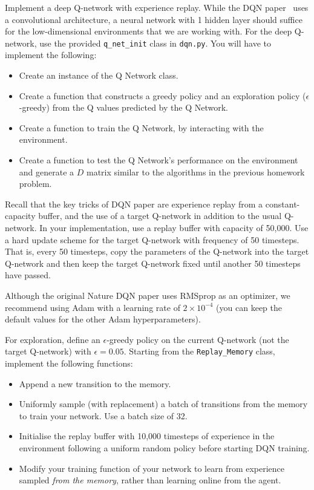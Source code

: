 \documentclass[12pt]{article}
\begin{document}
	Implement a deep Q-network with experience replay. 
	While the DQN paper~\cite{mnih2015human} uses a convolutional architecture, a neural network with 1 hidden layer should suffice for the low-dimensional environments that we are working with. For the deep Q-network, use the provided \texttt{q\_net\_init} class in \texttt{dqn.py}. You will have to implement the following:
    \begin{itemize}
        \item Create an instance of the Q Network class.
        \item Create a function that constructs a greedy policy and an exploration policy ($\epsilon$-greedy) from the Q values predicted by the Q Network.
        \item Create a function to train the Q Network, by interacting with the environment.
        \item  Create a function to test the Q Network's performance on the environment and generate a $D$ matrix similar to the algorithms in the previous homework problem.
    \end{itemize}
   
   Recall that the key tricks of DQN paper are experience replay from a constant-capacity buffer, and the use of a target Q-network in addition to the usual Q-network. In your implementation, use a replay buffer with capacity of 50,000. Use a hard update scheme for the target Q-network with frequency of 50 timesteps. That is, every 50 timesteps, copy the parameters of the Q-network into the target Q-network and then keep the target Q-network fixed until another 50 timesteps have passed.
   
   Although the original Nature DQN paper uses RMSprop as an optimizer, we recommend using Adam with a learning rate of $2\times 10^{-4}$ (you can keep the default values for the other Adam hyperparameters).
   
   For exploration, define an $\epsilon$-greedy policy on the current Q-network (not the target Q-network) with $\epsilon=0.05$. Starting from the \texttt{Replay\_Memory} class, implement the following functions: 
    \begin{itemize}
        \item Append a new transition to the memory. 
        \item Uniformly sample (with replacement) a batch of transitions from the memory to train your network. Use a batch size of 32.
        \item Initialise the replay buffer with 10,000 timesteps of experience in the environment following a uniform random policy before starting DQN training.
        \item Modify your training function of your network to learn from experience sampled \textit{from the memory}, rather than learning online from the agent. 
    \end{itemize} 
\end{document}
